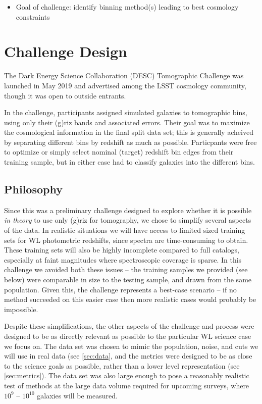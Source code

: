 \documentclass[twocolumn,twocolappendix]{aastex63}
\begin{document}
\begin{itemize}
    \item Goal of challenge: identify binning method(s) leading to best cosmology constraints 
\end{itemize}


\section{Challenge Design}

The Dark Energy Science Collaboration (DESC) Tomographic Challenge was launched in May 2019 and 
advertised among the LSST cosmology community, though it was open to outside entrants.

In the challenge, participants assigned simulated galaxies to tomographic bins,
using only their (g)riz bands and associated errors.  Their goal was to maximize the cosmological
information in the final split data set; this is generally acheived by separating different bins by 
redshift as much as possible.  Particpants were free to optimize or simply select nominal (target) 
redshift bin edges from their training sample, but in either case had to classify galaxies into the 
different bins.

\subsection{Philosophy}

Since this was a preliminary challenge designed to explore whether it is possible \emph{in theory}
to use only (g)riz for tomography, we chose to simplify several aspects of the data.  In realistic 
situations we will have access to limited sized training sets for WL photometric redshifts, since 
spectra are time-consuming to obtain.  These training sets will also be highly incomplete compared
to full catalogs, especially at faint magnitudes where spectroscopic coverage is sparse.  In this
challenge we avoided both these issues -- the training samples we provided (see below) were comparable
in size to the testing sample, and drawn from the same population.  Given this, the challenge
represents a best-case scenario -- if no method succeeded on this easier case then more realistic
cases would probably be impossible.

Despite these simplifications, the other aspects of the challenge and process were designed to be
as directly relevant as possible to the particular WL science case we focus on.  The data set
was chosen to mimic the population, noise, and cuts we will use in real data (see \autoref{sec:data}, 
and the metrics were designed to be as close to the science goals as possible, rather than a lower
level representation (see \autoref{sec:metrics}). The data set was also large enough to pose a 
reasonably realistic test of methods at the large data volume required for upcoming surveys, where
$10^9$ -- $10^{10}$ galaxies will be measured.
\end{document}
